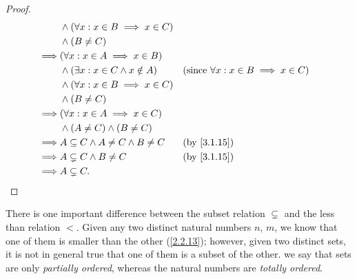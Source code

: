 \begin{proof}
\begin{align*}
		         & \land (\forall x : x \in B \implies x \in C)                                                                                                \\
		         & \land (B \neq C)                                                                                                                            \\
		\implies & (\forall x : x \in A \implies x \in B)                                                                                                      \\
		         & \land (\exists x : x \in C \land x \notin A)                                   &  & \text{(since \(\forall x : x \in B \implies x \in C\))} \\
		         & \land (\forall x : x \in B \implies x \in C)                                                                                                \\
		         & \land (B \neq C)                                                                                                                            \\
		\implies & (\forall x : x \in A \implies x \in C)                                                                                                      \\
		         & \land (A \neq C) \land (B \neq C)                                                                                                           \\
		\implies & A \subseteq C \land A \neq C \land B \neq C                                    &  & \by{3.1.15}                                             \\
		\implies & A \subsetneq C \land B \neq C                                                  &  & \by{3.1.15}                                             \\
		\implies & A \subsetneq C.
	\end{align*}
\end{proof}

\setcounter{thm}{19}
\begin{rmk}\label{3.1.20}
	There is one important difference between the subset relation \(\subsetneq\) and the less than relation \(<\).
	Given any two distinct natural numbers \(n\), \(m\), we know that one of them is smaller than the other (\cref{2.2.13});
	however, given two distinct sets, it is not in general true that one of them is a subset of the other.
	we say that sets are only \emph{partially ordered}, whereas the natural numbers are \emph{totally ordered}.
\end{rmk}

